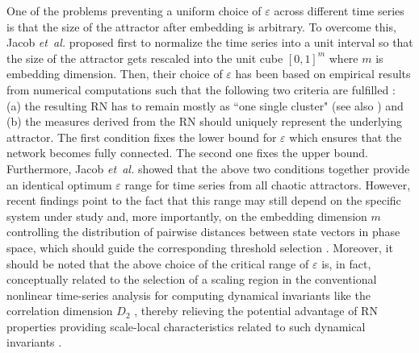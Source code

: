         		One of the problems preventing a uniform choice of $\varepsilon$ across different time series is that the size of the attractor after embedding is arbitrary. To overcome this, Jacob {\textit{et~al.}} \cite{Jacob2016b,Jacob2016a} proposed first to normalize the time series into a unit interval so that the size of the attractor gets rescaled into the unit cube $[0, 1]^m$ where $m$ is embedding dimension. Then, their choice of $\varepsilon$ has been based on empirical results from numerical computations such that the following two criteria are fulfilled \cite{Jacob2016b}: (a) the resulting RN has to remain mostly as ``one single cluster" (see also \cite{Donges2012}) and (b) the measures derived from the RN should uniquely represent the underlying attractor. The first condition fixes the lower bound for $\varepsilon$ which ensures that the network becomes fully connected. The second one fixes the upper bound. Furthermore, Jacob \emph{et~al.} showed that the above two conditions together provide an identical optimum $\varepsilon$ range for time series from all chaotic attractors. However, recent findings point to the fact that this range may still depend on the specific system under study and, more importantly, on the embedding dimension $m$ controlling the distribution of pairwise distances between state vectors in phase space, which should guide the corresponding threshold selection \cite{Kraemer2018}. Moreover, it should be noted that the above choice of the critical range of $\varepsilon$ is, in fact, conceptually related to the selection of a scaling region in the conventional nonlinear time-series analysis for computing dynamical invariants like the correlation dimension $D_2$ \cite{Grassberger1983PLA}, thereby relieving the potential advantage of RN properties providing scale-local characteristics related to such dynamical invariants \cite{Donner2011b}.

